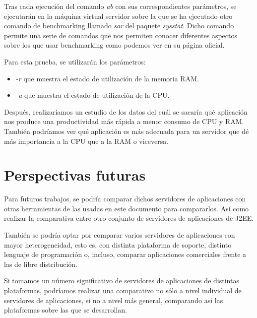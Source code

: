 \documentclass[a4paper, 10pt]{article}
\begin{document}
	Tras cada ejecución del comando \textit{ab} con sus correspondientes parámetros, se ejecutarán
	en la máquina virtual servidor sobre la que se ha ejecutado otro comando de benchmarking llamado
	\textit{sar} del paquete \textit{sysstat}. Dicho comando permite una serie de comandos que nos
	permiten conocer diferentes aspectos sobre los que usar benchmarking como podemos ver en su página
	oficial\cite{SAR_official}.
	
	Para esta prueba, se utilizarán los parámetros:
	\begin{itemize}
		\item \textit{-r} que muestra el estado de utilización de la memoria RAM.
		\item \textit{-u} que muestra el estado de utilización de la CPU.
	\end{itemize}
	
	Después, realizaríamos un estudio de los datos del cuál se sacaría qué aplicación nos produce
	una productividad más rápida a menor consumo de CPU y RAM. También podríamos ver qué aplicación
	es más adecuada para un servidor que dé más importancia a la CPU que a la RAM o viceversa.

\section{Perspectivas futuras}
	Para futuros trabajos, se podría comparar dichos servidores de aplicaciones con otras herramientas
	de las usadas en este documento para compararlos. Así como realizar la comparativa entre otro
	conjunto de servidores de aplicaciones de J2EE.
	
	También se podría optar por comparar varios servidores de aplicaciones con mayor heterogeneidad,
	esto es, con distinta plataforma de soporte, distinto lenguaje de programación o, incluso,
	comparar aplicaciones comerciales frente a las de libre distribución.
	
	Si tomamos un número significativo de servidores de aplicaciones de distintas plataformas,
	podríamos realizar una comparativo no sólo a nivel individual de servidores de aplicaciones, si
	no a nivel más general, comparando así las plataformas sobre las que se desarrollan.
	
\end{document}
